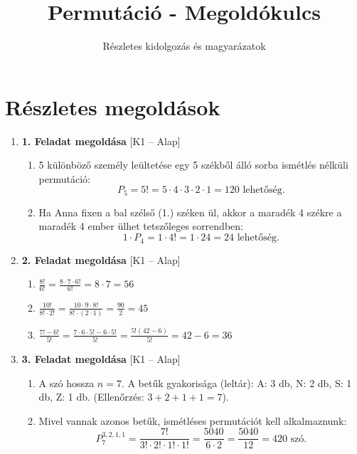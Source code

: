 \documentclass[12pt,a4paper]{article}
\title{Permutáció - Megoldókulcs}
\author{Részletes kidolgozás és magyarázatok}
\date{}
\begin{document}
\maketitle

\section*{Részletes megoldások}

\begin{enumerate}[label=\arabic*., leftmargin=*]

    \item \textbf{1. Feladat megoldása} \textsf{\small [K1 – Alap]}
    \begin{enumerate}[label=\alph*)]
        \item 5 különböző személy leültetése egy 5 székből álló sorba ismétlés nélküli permutáció:
        \[
        P_5 = 5! = 5 \cdot 4 \cdot 3 \cdot 2 \cdot 1 = 120 \text{ lehetőség.}
        \]
        \item Ha Anna fixen a bal szélső (1.) széken ül, akkor a maradék 4 székre a maradék 4 ember ülhet tetszőleges sorrendben:
        \[
        1 \cdot P_4 = 1 \cdot 4! = 1 \cdot 24 = 24 \text{ lehetőség.}
        \]
    \end{enumerate}

    \vspace{0.3cm}

    \item \textbf{2. Feladat megoldása} \textsf{\small [K1 – Alap]}
    \begin{enumerate}[label=\alph*)]
        \item $\displaystyle \frac{8!}{6!} = \frac{8 \cdot 7 \cdot 6!}{6!} = 8 \cdot 7 = 56$
        \item $\displaystyle \frac{10!}{8! \cdot 2!} = \frac{10 \cdot 9 \cdot 8!}{8! \cdot (2 \cdot 1)} = \frac{90}{2} = 45$
        \item $\displaystyle \frac{7! - 6!}{5!} = \frac{7 \cdot 6 \cdot 5! - 6 \cdot 5!}{5!} = \frac{5!(42 - 6)}{5!} = 42 - 6 = 36$
    \end{enumerate}

    \vspace{0.3cm}

    \item \textbf{3. Feladat megoldása} \textsf{\small [K1 – Alap]}
    \begin{enumerate}[label=\alph*)]
        \item A szó hossza $n = 7$. A betűk gyakorisága (leltár): 
        A: 3 db, N: 2 db, S: 1 db, Z: 1 db. (Ellenőrzés: $3 + 2 + 1 + 1 = 7$).
        \item Mivel vannak azonos betűk, ismétléses permutációt kell alkalmaznunk:
        \[
        P_7^{3, 2, 1, 1} = \frac{7!}{3! \cdot 2! \cdot 1! \cdot 1!} = \frac{5040}{6 \cdot 2} = \frac{5040}{12} = 420 \text{ szó.}
        \]
    \end{enumerate}


\end{enumerate}
\end{document}
